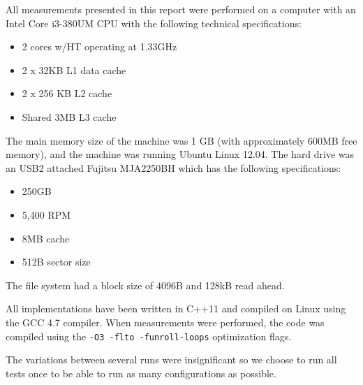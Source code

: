 All measurements presented in this report were performed on a computer
with an Intel Core i3-380UM CPU with the following technical
specifications:
\begin{itemize}
\item 2 cores w/HT operating at 1.33GHz
\item 2 x 32KB L1 data cache
\item 2 x 256 KB L2 cache
\item Shared 3MB L3 cache
\end{itemize}
The main memory size of the machine was 1 GB (with approximately 600MB free memory), and the machine was running Ubuntu
Linux 12.04. The hard drive was an USB2 attached Fujitsu MJA2250BH which has the following specifications:

\begin{itemize}
\item 250GB
\item 5,400 RPM
\item 8MB cache
\item 512B sector size
\end{itemize}

The file system had a block size of 4096B and 128kB read ahead.

All implementations have been
written in C++11 and compiled on Linux using the GCC 4.7 compiler. When measurements were performed, the
code was compiled using the \texttt{-O3 -flto -funroll-loops}
optimization flags.

The variations between several runs were insignificant so we choose to run all tests once to be able to run as many configurations as possible.

